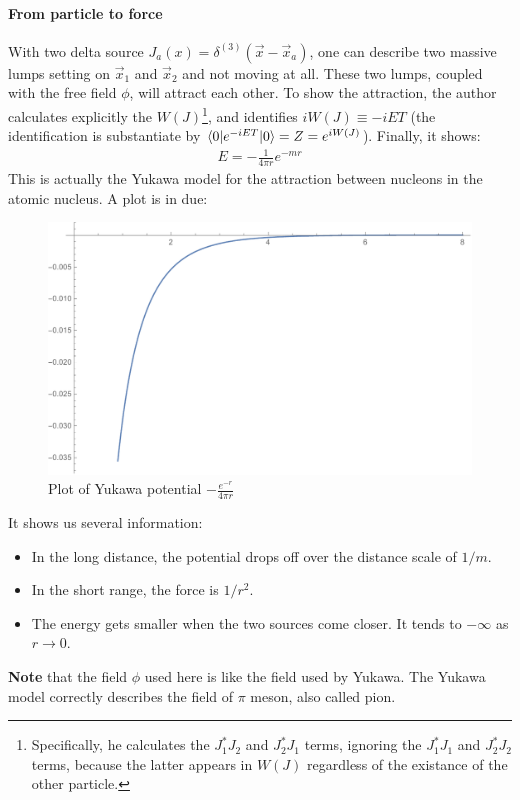 \documentclass{book}
\numberwithin{equation}{subsection} %
\theoremstyle{definition}
\begin{document}
\paragraph{From particle to force}
With two delta source $J_a(x)=\delta^{(3)}(\vec{x}-\vec{x}_a)$, one can
describe two massive lumps setting on $\vec{x}_1$ and $\vec{x}_2$ and
not moving at all. These two lumps, coupled with the free field $\phi$,
will attract each other. To show the attraction, the author calculates
explicitly the $W(J)$\footnote{
    Specifically, he calculates the $J^*_1J_2$ and $J^*_2J_1$ terms,
    ignoring the $J^*_1J_1$ and $J^*_2J_2$ terms, because the latter
    appears in $W(J)$ regardless of the existance of the other particle.
}, and identifies $iW(J) \equiv -iET$ (the
identification is substantiate by $\braket{0|e^{-iET}|0} = Z = e^{iW(J)}$).
Finally, it shows:
\begin{align}
    E= -\frac{1}{4\pi r}e^{-mr}
\end{align}
This is actually the Yukawa model for the attraction between nucleons
in the atomic nucleus. A plot is in due:
\begin{figure}[H]
    \centering
    \includegraphics[width=0.8\linewidth]{pics/Yukawa-potential.pdf}
    \caption{Plot of Yukawa potential $-\frac{e^{-r}}{4 \pi  r}$}
\end{figure}

It shows us several information:
\begin{itemize}
    \item In the long distance, the potential drops off over the
        distance scale of $1/m$.
    \item In the short range, the force is $1/r^2$.
    \item The energy gets smaller when the two sources come closer.
        It tends to $-\infty$ as $r\to 0$.
\end{itemize}

\textbf{Note} that the field $\phi$ used here is like the field used
by Yukawa. The Yukawa model correctly describes the field of
$\pi$ meson, also called pion.
\end{document}
